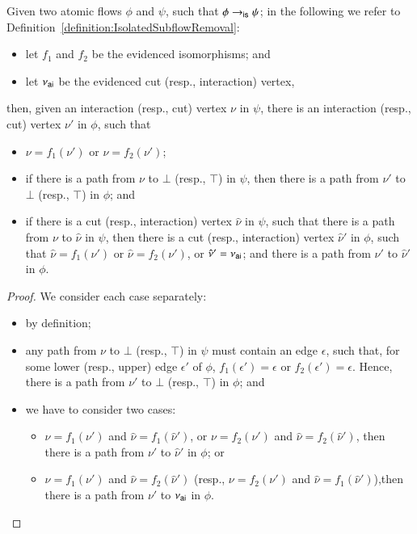 \begin{lemma}\label{lemma:IsolatedSubflowRemovalPaths}
Given two atomic flows $\phi$ and $\psi$, such that $\phi\to_{\mathsf{is}}\psi$; in the following we refer to Definition~\ref{definition:IsolatedSubflowRemoval}:
\begin{itemize}
\item let $f_1$ and $f_2$ be the evidenced isomorphisms; and
\item let $\nu_{\mathsf{ai}}$ be the evidenced cut (resp., interaction) vertex,
\end{itemize}
then, given an interaction (resp., cut) vertex $\nu$ in $\psi$, there is an interaction (resp., cut) vertex $\nu'$ in $\phi$, such that
\begin{itemize}
\item $\nu=f_1(\nu')$ or $\nu=f_2(\nu')$;
\item if there is a path from $\nu$ to $\bot$ (resp., $\top$) in $\psi$, then there is a path from $\nu'$ to $\bot$ (resp., $\top$) in $\phi$; and
\item if there is a cut (resp., interaction) vertex $\hat\nu$ in $\psi$, such that there is a path from $\nu$ to $\hat\nu$ in $\psi$, then there is a cut (resp., interaction) vertex $\hat\nu'$ in $\phi$, such that $\hat\nu=f_1(\nu')$ or $\hat\nu=f_2(\nu')$, or $\hat\nu'=\nu_{\mathsf{ai}}$; and there is a path from $\nu'$ to $\hat\nu'$ in $\phi$.
\end{itemize}
\end{lemma}

\begin{proof}
We consider each case separately:
\begin{itemize}
 \item by definition;
 \item any path from $\nu$ to $\bot$ (resp., $\top$) in $\psi$ must contain an edge $\epsilon$, such that, for some lower (resp., upper) edge $\epsilon'$ of $\phi$, $f_1(\epsilon')=\epsilon$ or $f_2(\epsilon')=\epsilon$. Hence, there is a path from $\nu'$ to $\bot$ (resp., $\top$) in $\phi$; and
 \item we have to consider two cases:
 \begin{itemize}
  \item $\nu=f_1(\nu')$ and $\hat\nu=f_1(\hat\nu')$, or $\nu=f_2(\nu')$ and $\hat\nu=f_2(\hat\nu')$, then there is a path from $\nu'$ to $\hat\nu'$ in $\phi$; or
  \item $\nu=f_1(\nu')$ and $\hat\nu=f_2(\hat\nu')$ (resp., $\nu=f_2(\nu')$ and $\hat\nu=f_1(\hat\nu')$),then there is a path from $\nu'$ to $\nu_{\mathsf{ai}}$ in $\phi$.
 \end{itemize}
\end{itemize}
\end{proof}


